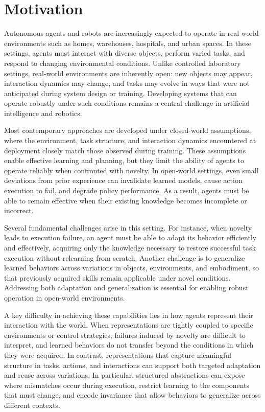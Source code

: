 \section{Motivation}
\label{sec:motivation}

Autonomous agents and robots are increasingly expected to operate in real-world environments such as homes, warehouses, hospitals, and urban spaces. In these settings, agents must interact with diverse objects, perform varied tasks, and respond to changing environmental conditions. Unlike controlled laboratory settings, real-world environments are inherently open: new objects may appear, interaction dynamics may change, and tasks may evolve in ways that were not anticipated during system design or training. Developing systems that can operate robustly under such conditions remains a central challenge in artificial intelligence and robotics.

Most contemporary approaches are developed under closed-world assumptions, where the environment, task structure, and interaction dynamics encountered at deployment closely match those observed during training. These assumptions enable effective learning and planning, but they limit the ability of agents to operate reliably when confronted with novelty. In open-world settings, even small deviations from prior experience can invalidate learned models, cause action execution to fail, and degrade policy performance. As a result, agents must be able to remain effective when their existing knowledge becomes incomplete or incorrect.

Several fundamental challenges arise in this setting. For instance, when novelty leads to execution failure, an agent must be able to adapt its behavior efficiently and effectively, acquiring only the knowledge necessary to restore successful task execution without relearning from scratch. Another challenge is to generalize learned behaviors across variations in objects, environments, and embodiment, so that previously acquired skills remain applicable under novel conditions. Addressing both adaptation and generalization is essential for enabling robust operation in open-world environments.

A key difficulty in achieving these capabilities lies in how agents represent their interaction with the world. When representations are tightly coupled to specific environments or control strategies, failures induced by novelty are difficult to interpret, and learned behaviors do not transfer beyond the conditions in which they were acquired. In contrast, representations that capture meaningful structure in tasks, actions, and interactions can support both targeted adaptation and reuse across variations. In particular, structured abstractions can expose where mismatches occur during execution, restrict learning to the components that must change, and encode invariance that allow behaviors to generalize across different contexts.
